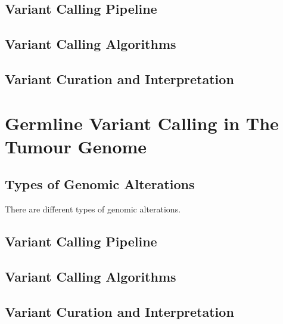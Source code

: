 \subsection{Variant Calling Pipeline}

\subsection{Variant Calling Algorithms}

\subsection{Variant Curation and Interpretation}

\section{Germline Variant Calling in The Tumour Genome}
\label{sec:GermlineVariantCallinginTheTumourGenome}

\subsection{Types of Genomic Alterations}
There are different types of genomic alterations.

\subsection{Variant Calling Pipeline}

\subsection{Variant Calling Algorithms}

\subsection{Variant Curation and Interpretation}



\endinput

Germline pharmacogenomic (PGx) variants can influence a patient's response to chemotherapy. Using next-generation sequencing (NGS) technologies, PGx variants can be screened to identify patients who are susceptible to toxicity risk, thereby preventing chemotherapy-associated morbidities. However, clinical NGS testing in oncology is challenging due to the lack of matched normal DNA while tumour biopsies are formalin-fixed paraffin-embedded (FFPE) for histologic examinations. Formalin induces DNA fragmentation and sequence artifacts, specifically C$>$T/A$>$G base transitions. Moreover, the ability of NGS approaches to interrogate genomic content at increased depth and breadth can result in detection of variant of unknown significance (VUS) and incidental findings of medical value. At present, there are limited guidelines available for management of these variant categories. Despite these challenges, would it be possible/feasible to harness a clinical targeted NGS panel that only sequence FFPE tumour DNA for germline PGx testing?

